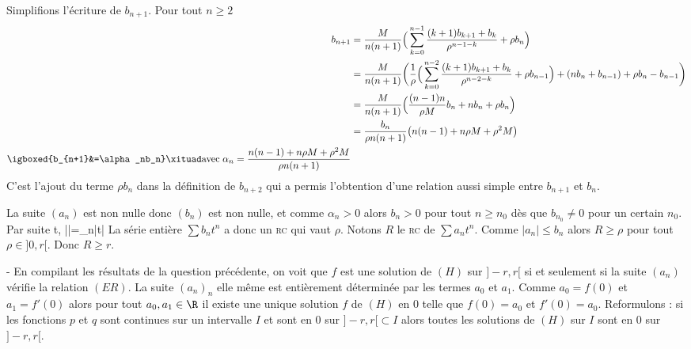 \begin{exer}
\xit Simplifions l'écriture de $b_{n+1}$. Pour tout $n\geq 2$
\begin{align*}
b_{n+1}&=
\frac{M}{n(n+1)}\Big(\sum_{k=0}^{n-1}
\frac{(k+1)b_{k+1}+b_k}{\rho^{n-1-k}}+ \rho b_{n}\Big)  \\ &=
\frac{M}{n(n+1)}\bigg(\frac1\rho\Big(\sum_{k=0}^{n-2}
\frac{(k+1)b_{k+1}+b_k}{\rho^{n-2-k}}+\rho b_{n-1}\Big)+(nb_n+b_{n-1}) +\rho b_{n}- b_{n-1}\bigg) \\ &=
\frac{M}{n(n+1)}\Big(\frac{(n-1)n}{\rho M}b_n+nb_n+\rho b_{n}\Big) \\ &=
\frac{b_n}{\rho n(n+1)}\big(n(n-1)+n\rho M+\rho^2 M\big) \\
\igboxed{b_{n+1}&=\alpha_nb_n} \xituad \text{avec}\;\alpha_n=\frac{n(n-1)+n\rho M+\rho^2M}{\rho n(n+1)}
\end{align*}
\nb C'est l'ajout du terme $\rho b_n$ dans la définition de $b_{n+2}$ qui a permis l'obtention d'une relation aussi simple entre $b_{n+1}$ et $b_n$.
\endnb

\xit La suite $(a_n)$ est non nulle donc $(b_n)$ est non nulle, et comme $\alpha_n>0$ alors $b_n>0$ pour tout $n\geq n_0$ dès que $b_{n_0}\ne 0$ pour un certain $n_0$. Par suite
\< 
\forall t,\; \Big|\Big|=\alpha_n|t|\lra {}\rho
\>
La série entière $\sum b_nt^n$ a donc un \textsc{rc} qui vaut $\rho$. Notons $R$ le \textsc{rc} de $\sum a_n t^n$. Comme $|a_n|\leq b_n$ alors $R\geq \rho$ pour tout $\rho \in]0,r[$. Donc $R\geq r$.

\xit- En compilant les résultats de la question précédente, on voit que $f$ est une solution de $(H)$ sur $]-r,r[$ si et seulement si la suite $(a_n)$ vérifie la relation $(ER)$. La suite $(a_n)_n$ elle même est entièrement déterminée par les termes $a_0$ et $a_1$. Comme $a_0=f(0)$ et $a_1=f'(0)$ alors pour tout $a_0,a_1\in \R$ il existe une unique solution $f$ de $(H)$ \dse en $0$ telle que $f(0)=a_0$ et $f'(0)=a_0$.
\nb Reformulons : si les fonctions $p$ et $q$ sont continues sur un intervalle $I$ et sont \dse en $0$ sur $]-r,r[\subset I$ alors toutes les solutions de $(H)$ sur $I$ sont \dse en $0$ sur $]-r,r[$.
\endnb
\exit
\end{exer}

